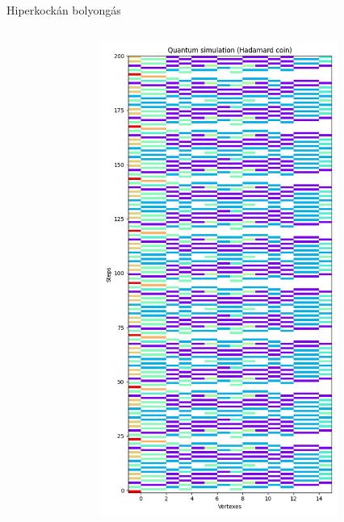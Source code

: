 \documentclass[aspectratio=169]{beamer}
\begin{document}
\begin{frame}{Hiperkockán bolyongás}
\begin{columns}[onlytextwidth]
\begin{column}{.25\textwidth}
\begin{figure}
      \end{figure}
    \end{column}
    \begin{column}{.25\textwidth}
      \begin{figure}
        \includegraphics[width=0.9\textwidth]{./tdk_figures/results/hypercube/hadamard.jpg}
      \end{figure}
    \end{column}
    \begin{column}{.25\textwidth}
    \end{column}
  \end{columns}
\end{frame}
\end{document}
